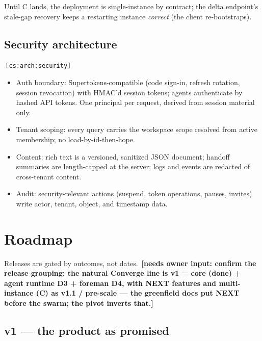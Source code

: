 \documentclass[11pt,a4paper]{report}
\newcommand{\cs}[1]{\,\texttt{\scriptsize[cs:#1]}\label{cs:#1}}
\newcommand{\owner}[1]{\,\textcolor{red!60!black}{\textbf{[needs owner input: #1]}}}
\begin{document}
Until C lands, the deployment is single-instance by contract; the delta
endpoint's stale-gap recovery keeps a restarting instance \emph{correct}
(the client re-bootstraps).

\section{Security architecture}
\cs{arch:security}

\begin{itemize}
\item Auth boundary: Supertokens-compatible (code sign-in, refresh
  rotation, session revocation) with HMAC'd session tokens; agents
  authenticate by hashed API tokens. One principal per request, derived
  from session material only.
\item Tenant scoping: every query carries the workspace scope resolved
  from active membership; no load-by-id-then-hope.
\item Content: rich text is a versioned, sanitized JSON document;
  handoff summaries are length-capped at the server; logs and events are
  redacted of cross-tenant content.
\item Audit: security-relevant actions (suspend, token operations,
  pauses, invites) write actor, tenant, object, and timestamp data.
\end{itemize}

\chapter{Roadmap}
\label{ch:roadmap}

Releases are gated by outcomes, not dates. \owner{confirm the release
  grouping: the natural Converge line is v1 = core (done) + agent
  runtime D3 + foreman D4, with NEXT features and multi-instance (C) as
  v1.1 / pre-scale --- the greenfield docs put NEXT before the swarm;
  the pivot inverts that.}

\section{v1 --- the product as promised}
\end{document}
